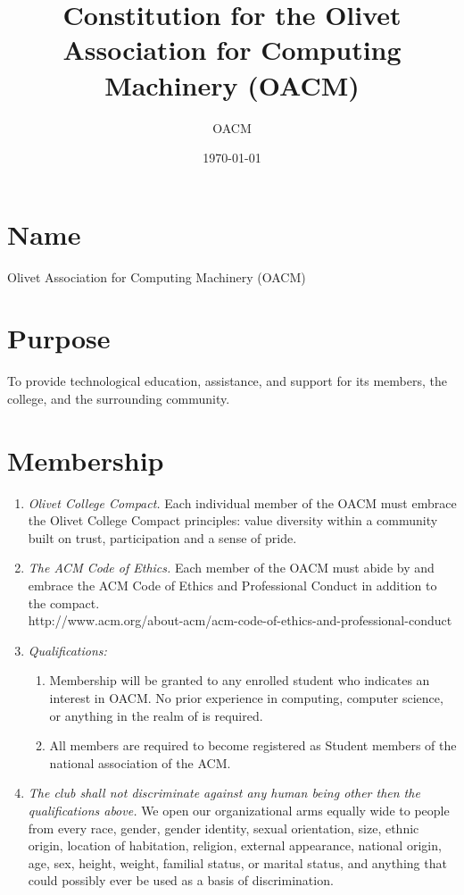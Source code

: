 \documentclass[letterpaper, 12pt]{article}
\title{Constitution for the Olivet Association for Computing Machinery (OACM)}
\author{OACM}
\date{\today}
\begin{document}
\maketitle
\section{Name}
Olivet Association for Computing Machinery (OACM)
\section{Purpose}
To provide technological education, assistance, and support for its members, the college, and the surrounding community.
\section{Membership}
\begin{enumerate}
    \item \textit{Olivet College Compact.} Each individual member of the OACM 
        must embrace the Olivet College Compact principles: value diversity 
        within a community built on trust, participation and a sense of pride.  
    \item \textit{The ACM Code of Ethics.}  Each member of the OACM must 
        abide by and embrace the ACM Code of Ethics and Professional Conduct 
        in addition to the compact. \\
        http://www.acm.org/about-acm/acm-code-of-ethics-and-professional-conduct
    \item \textit{Qualifications:}
        \begin{enumerate}
            \item Membership will be granted to any enrolled student who 
                indicates an interest in OACM.  No prior experience in 
                computing, computer science, or anything in the realm of is 
                required.
            \item All members are required to become registered as Student 
                members of the national association of the ACM.
        \end{enumerate}
     \item \textit{The club shall not discriminate against any human being 
         other then the qualifications above.} We open our organizational 
         arms equally wide to people from every race, gender, gender 
         identity, sexual orientation, size, ethnic origin, location of 
         habitation, religion, external appearance, national origin, age, 
         sex, height, weight, familial status, or marital status, and 
         anything that could possibly ever be used as a basis of 
         discrimination. 
\end{enumerate}
\end{document}
